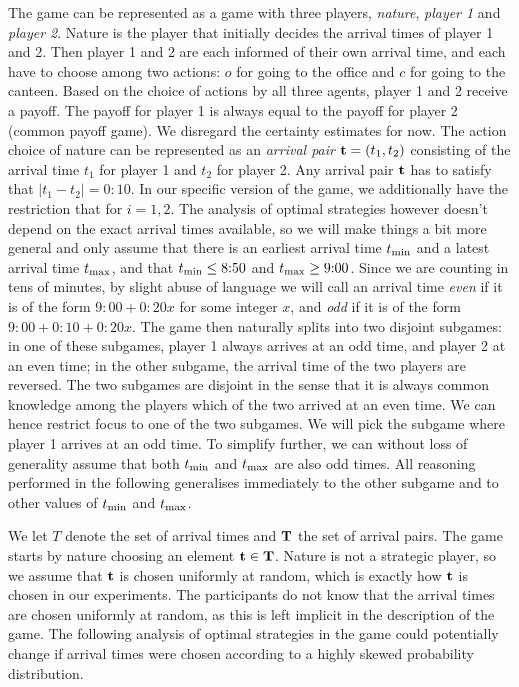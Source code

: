 The game can be represented as a game with three players, \emph{nature}, \emph{player 1} and \emph{player 2}. Nature is the player that initially decides the arrival times of player 1 and 2. Then player 1 and 2 are each informed of their own arrival time, and each have to choose among two actions: $o$ for going to the office and $c$ for going to the canteen. Based on the choice of actions by all three agents, player 1 and 2 receive a payoff. The payoff for player 1 is always equal to the payoff for player 2 (common payoff game). We  disregard the certainty estimates for now. The action choice of nature can be represented as an \emph{arrival pair} ${\bf t} = (t_1,t_2)$ consisting of the arrival time $t_1$ for player 1 and $t_2$ for player 2. Any arrival pair $\bf t$ has to satisfy that  $| t_1 - t_2 | = 0{:}10$. In our specific version of the game, we additionally have the restriction that  for $i = 1,2$. The analysis of optimal strategies however doesn't depend on the exact arrival times available, so we will make things a bit more general and only assume that there is an earliest arrival time $t_{\min}$ and a latest arrival time $t_{\max}$, and that $t_{\min} \leq 8{:}50$ and $t_{\max} \geq 9{:}00$. Since we are counting in tens of minutes, by slight abuse of language we will call an arrival time \emph{even} if it is of the form $9{:}00+0{:}20x$ for some integer $x$, and \emph{odd} if it is of the form $9{:}00+0{:}10+0{:}20x$. The game then naturally splits into two disjoint subgames: in one of these subgames, player 1 always arrives at an odd time, and player 2 at an even time; 
 in the other subgame, the arrival time of the two players are reversed. The two subgames are disjoint in the sense that it is always common knowledge among the players which of the two arrived at an even time. We can hence restrict focus to one of the two subgames. We will pick the subgame where player 1 arrives at an odd time. To simplify further, we can without loss of generality assume that both $t_{\min}$ and $t_{\max}$ are also odd times. All reasoning performed in the following generalises immediately to the other subgame and to other values of $t_{\min}$ and $t_{\max}$. 
 
We let $T$ denote the set of arrival times and $\bf T$ the set of arrival pairs.  
The game starts by nature choosing an element $\mathbf{t} \in \bf T$. Nature is not a strategic player, so we assume that $\bf t$ is chosen uniformly at random, which is exactly how $\bf t$ is chosen in our experiments. The participants do not know that the arrival times are chosen uniformly at random, as this is left implicit in the description of the game. The following analysis of optimal strategies in the game could potentially change if arrival times were chosen according to a highly skewed probability distribution.


